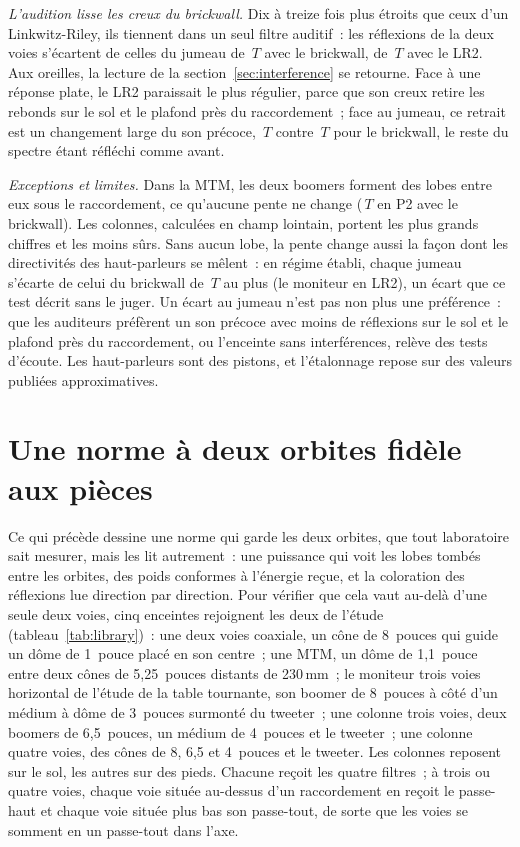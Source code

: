 \documentclass[11pt,a4paper]{article}
\begin{document}
\emph{L'audition lisse les creux du brickwall.} Dix à treize fois plus étroits que ceux d'un
Linkwitz-Riley, ils tiennent dans un seul filtre auditif~: les réflexions de la deux voies s'écartent de
celles du jumeau de \nslDomeFirRefl\,$T$ avec le brickwall, de \nslDomeLrTwoRefl\,$T$ avec le LR2. Aux
oreilles, la lecture de la section~\ref{sec:interference} se retourne. Face à une réponse plate, le LR2
paraissait le plus régulier, parce que son creux retire les rebonds sur le sol et le plafond près du
raccordement~; face au jumeau, ce retrait est un changement large du son précoce, \nslDomeLrTwoEars\,$T$
contre \nslDomeFirEars\,$T$ pour le brickwall, le reste du spectre étant réfléchi comme avant.

\emph{Exceptions et limites.} Dans la MTM, les deux boomers forment des lobes entre eux sous le
raccordement, ce qu'aucune pente ne change (\nslMtmFirRefl\,$T$ en P2 avec le brickwall). Les colonnes,
calculées en champ lointain, portent les plus grands chiffres et les moins sûrs. Sans aucun lobe, la
pente change aussi la façon dont les directivités des haut-parleurs se mêlent~: en régime établi, chaque
jumeau s'écarte de celui du brickwall de \nslBlendMonitorLrTwo\,$T$ au plus (le moniteur en LR2), un écart
que ce test décrit sans le juger. Un écart au jumeau n'est pas non plus une préférence~: que les auditeurs
préfèrent un son précoce avec moins de réflexions sur le sol et le plafond près du raccordement, ou
l'enceinte sans interférences, relève des tests d'écoute. Les haut-parleurs sont des pistons, et
l'étalonnage repose sur des valeurs publiées approximatives.

\clearpage
\section{Une norme à deux orbites fidèle aux pièces}
\label{sec:proposal}

Ce qui précède dessine une norme qui garde les deux orbites, que tout laboratoire sait mesurer, mais
les lit autrement~: une puissance qui voit les lobes tombés entre les orbites, des poids conformes à
l'énergie reçue, et la coloration des réflexions lue direction par direction. Pour vérifier que cela
vaut au-delà d'une seule deux voies, cinq enceintes rejoignent les deux de l'étude
(tableau~\ref{tab:library})~: une deux voies coaxiale, un cône de 8~pouces qui guide un dôme de 1~pouce
placé en son centre~; une MTM, un dôme de 1,1~pouce entre deux cônes de 5,25~pouces distants de
230\,mm~; le moniteur trois voies horizontal de l'étude de la table tournante, son boomer de 8~pouces à
côté d'un médium à dôme de 3~pouces surmonté du tweeter~; une colonne trois voies, deux boomers de
6,5~pouces, un médium de 4~pouces et le tweeter~; une colonne quatre voies, des cônes de 8, 6,5 et
4~pouces et le tweeter. Les colonnes reposent sur le sol, les autres sur des pieds. Chacune reçoit les
quatre filtres~; à trois ou quatre voies, chaque voie située au-dessus d'un raccordement en reçoit le
passe-haut et chaque voie située plus bas son passe-tout, de sorte que les voies se somment en un
passe-tout dans l'axe.
\end{document}
